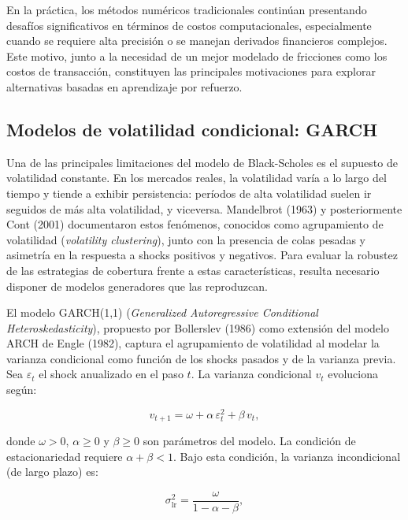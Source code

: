 \documentclass[11pt,a4paper,spanish]{article}
\numberwithin{equation}{section} %
\begin{document}
En la práctica, los métodos numéricos tradicionales continúan presentando desafíos significativos en términos de costos computacionales, especialmente cuando se requiere alta precisión o se manejan derivados financieros complejos. Este motivo, junto a la necesidad de un mejor modelado de fricciones como los costos de transacción, constituyen las principales motivaciones para explorar alternativas basadas en aprendizaje por refuerzo.

\subsection{Modelos de volatilidad condicional: GARCH}\label{subsec:garch}

Una de las principales limitaciones del modelo de Black-Scholes es el supuesto de volatilidad constante. En los mercados reales, la volatilidad varía a lo largo del tiempo y tiende a exhibir persistencia: períodos de alta volatilidad suelen ir seguidos de más alta volatilidad, y viceversa. Mandelbrot (1963) y posteriormente Cont (2001) documentaron estos fenómenos, conocidos como agrupamiento de volatilidad (\textit{volatility clustering}), junto con la presencia de colas pesadas y asimetría en la respuesta a shocks positivos y negativos. Para evaluar la robustez de las estrategias de cobertura frente a estas características, resulta necesario disponer de modelos generadores que las reproduzcan.

El modelo GARCH(1,1) (\textit{Generalized Autoregressive Conditional Heteroskedasticity}), propuesto por Bollerslev (1986) como extensión del modelo ARCH de Engle (1982), captura el agrupamiento de volatilidad al modelar la varianza condicional como función de los shocks pasados y de la varianza previa. Sea $\varepsilon_t$ el shock anualizado en el paso $t$. La varianza condicional $v_t$ evoluciona según:

\begin{equation}
v_{t+1} = \omega + \alpha\, \varepsilon_t^2 + \beta\, v_t,
\label{eq:garch}
\end{equation}

donde $\omega > 0$, $\alpha \geq 0$ y $\beta \geq 0$ son parámetros del modelo. La condición de estacionariedad requiere $\alpha + \beta < 1$. Bajo esta condición, la varianza incondicional (de largo plazo) es:

\begin{equation}
\sigma_{\text{lr}}^2 = \frac{\omega}{1 - \alpha - \beta},
\end{equation}
\end{document}
